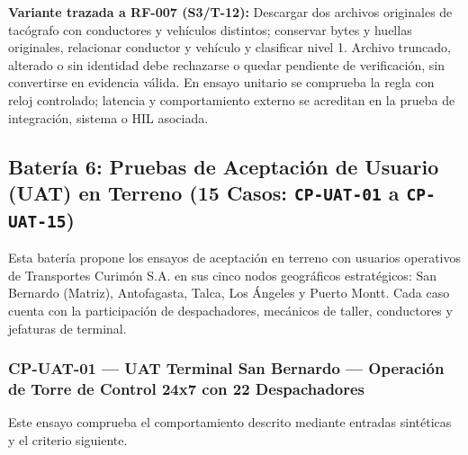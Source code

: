 \par\noindent\textbf{Variante trazada a RF-007 (S3/T-12):} Descargar dos archivos originales de tacógrafo con conductores y vehículos distintos; conservar bytes y huellas originales, relacionar conductor y vehículo y clasificar nivel 1. Archivo truncado, alterado o sin identidad debe rechazarse o quedar pendiente de verificación, sin convertirse en evidencia válida. En ensayo unitario se comprueba la regla con reloj controlado; latencia y comportamiento externo se acreditan en la prueba de integración, sistema o HIL asociada.\par
\subsection*{Batería 6: Pruebas de Aceptación de Usuario (UAT) en Terreno (15 Casos: \texttt{C\allowbreak{}P\allowbreak{}-\allowbreak{}U\allowbreak{}A\allowbreak{}T\allowbreak{}-\allowbreak{}0\allowbreak{}1\allowbreak{}} a \texttt{C\allowbreak{}P\allowbreak{}-\allowbreak{}U\allowbreak{}A\allowbreak{}T\allowbreak{}-\allowbreak{}1\allowbreak{}5\allowbreak{}})}

Esta batería propone los ensayos de aceptación en terreno con usuarios operativos de Transportes Curimón S.A. en sus cinco nodos geográficos estratégicos: San Bernardo (Matriz), Antofagasta, Talca, Los Ángeles y Puerto Montt. Cada caso cuenta con la participación de despachadores, mecánicos de taller, conductores y jefaturas de terminal.\par






\subsubsection*{CP-UAT-01 — UAT Terminal San Bernardo — Operación de Torre de Control 24x7 con 22 Despachadores}\label{sec:9-cp-uat-01}
Este ensayo comprueba el comportamiento descrito mediante entradas sintéticas y el criterio siguiente.

